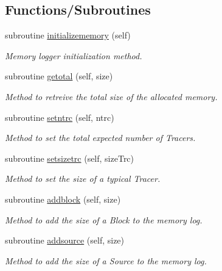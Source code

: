 \subsection*{Functions/\+Subroutines}
\begin{DoxyCompactItemize}
\item 
subroutine \mbox{\hyperlink{namespacesimulation__memory__mod_ac8306165e4ec88fec9a2b8b719f61893}{initializememory}} (self)
\begin{DoxyCompactList}\small\item\em Memory logger initialization method. \end{DoxyCompactList}\item 
subroutine \mbox{\hyperlink{namespacesimulation__memory__mod_acf04d6b930ed3ffbc0950afd86033c51}{getotal}} (self, size)
\begin{DoxyCompactList}\small\item\em Method to retreive the total size of the allocated memory. \end{DoxyCompactList}\item 
subroutine \mbox{\hyperlink{namespacesimulation__memory__mod_ab16ab3a2c4acf078dd1a9e75778f64df}{setntrc}} (self, ntrc)
\begin{DoxyCompactList}\small\item\em Method to set the total expected number of Tracers. \end{DoxyCompactList}\item 
subroutine \mbox{\hyperlink{namespacesimulation__memory__mod_acc218928b4d5fc707cbe3bc4befafa65}{setsizetrc}} (self, size\+Trc)
\begin{DoxyCompactList}\small\item\em Method to set the size of a typical Tracer. \end{DoxyCompactList}\item 
subroutine \mbox{\hyperlink{namespacesimulation__memory__mod_a4169689db37b3ba35e092096a7019f80}{addblock}} (self, size)
\begin{DoxyCompactList}\small\item\em Method to add the size of a Block to the memory log. \end{DoxyCompactList}\item 
subroutine \mbox{\hyperlink{namespacesimulation__memory__mod_a940ff42fa3a49423f9ac98da2bffa54c}{addsource}} (self, size)
\begin{DoxyCompactList}\small\item\em Method to add the size of a Source to the memory log. \end{DoxyCompactList}\item 

\end{DoxyCompactItemize}
